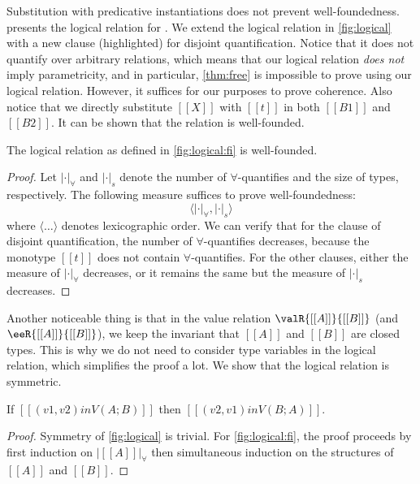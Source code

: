 Substitution with predicative instantiations does not prevent well-foundedness.
 presents the logical relation for \fnamee. We extend the
logical relation in \cref{fig:logical} with a new clause (highlighted) for
disjoint quantification. Notice that it does not quantify over arbitrary
relations, which means that our logical relation \textit{does not} imply
parametricity, and in particular, \cref{thm:free} is impossible to prove using
our logical relation. However, it suffices for our purposes to prove coherence.
Also notice that we directly substitute $[[X]]$ with $[[t]]$ in both $[[B1]]$
and $[[B2]]$. It can be shown that the relation is well-founded.

\begin{lemma}
  The logical relation as defined in \cref{fig:logical:fi} is well-founded.
\end{lemma}
\begin{proof}
  Let $| \cdot |_{\forall}$ and $| \cdot |_s$ denote the number of
  $\forall$-quantifies and the size of types, respectively. The following
  measure suffices to prove well-foundedness:
  \[
\langle | \cdot |_{\forall} ,  | \cdot |_s   \rangle
  \]
  where $\langle \dots \rangle$ denotes lexicographic order. We can verify that
  for the clause of disjoint quantification, the number of $\forall$-quantifies
  decreases, because the monotype $[[t]]$ does not contain $\forall$-quantifies.
  For the other clauses, either the measure of $| \cdot |_{\forall}$ decreases,
  or it remains the same but the measure of $| \cdot |_s$ decreases.
\end{proof}


Another noticeable thing is that in the value relation $ \valR{[[A]]}{[[B]]} $
(and $\eeR{[[A]]}{[[B]]} $), we keep the invariant that $[[A]]$ and $[[B]]$
are closed types. This is why we do not need to consider type variables in the
logical relation, which simplifies the proof a lot. We show that the logical
relation is symmetric.


\begin{lemma}
  If $[[ (v1, v2) in V ( A ; B ) ]]$ then $[[ (v2, v1) in V ( B ; A ) ]]$.
\end{lemma}
\begin{proof}
  Symmetry of \cref{fig:logical} is trivial. For \cref{fig:logical:fi}, the
  proof proceeds by first induction on $ | [[A]] |_{\forall} $ then simultaneous
  induction on the structures of $[[A]]$ and $[[B]]$.
\end{proof}

